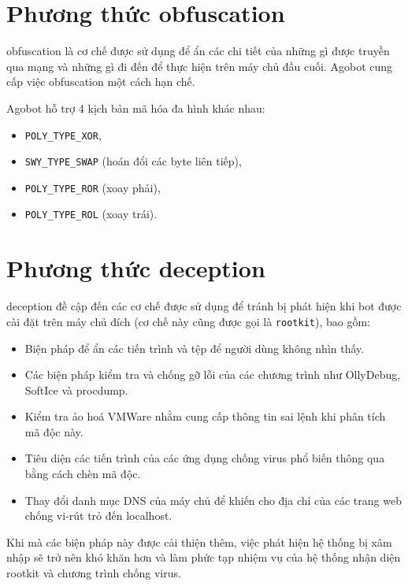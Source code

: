 \section{Phương thức obfuscation}
\Gls{obfuscation} là cơ chế được sử dụng để ẩn các chi tiết của những gì được
truyền qua mạng và những gì đi đến để thực hiện trên máy chủ đầu cuối.
Agobot cung cấp việc \gls{obfuscation} một cách hạn chế.

Agobot hỗ trợ 4 kịch bản mã hóa đa hình khác nhau:
\begin{itemize}
\item \texttt{POLY\_TYPE\_XOR},
\item \texttt{SWY\_TYPE\_SWAP} (hoán đổi các byte liên tiếp),
\item \texttt{POLY\_TYPE\_ROR} (xoay phải),
\item \texttt{POLY\_TYPE\_ROL} (xoay trái).
\end{itemize}

\section{Phương thức deception}

\Gls{deception} đề cập đến các cơ chế được sử dụng để tránh bị phát hiện khi bot được cài đặt
trên máy chủ đích (cơ chế này cũng được gọi là \texttt{rootkit}), bao gồm:

\begin{itemize}
\item Biện pháp để ẩn các tiến trình và tệp để người dùng không nhìn thấy.
\item Các biện pháp kiểm tra và chống gỡ lỗi của các chương trình như OllyDebug, SoftIce và procdump.
\item Kiểm tra ảo hoá VMWare nhằm cung cấp thông tin sai lệnh khi phân tích mã độc này.
\item Tiêu diện các tiến trình của các ứng dụng chống virus phổ biến thông qua bằng cách chèn mã độc.
\item Thay đổi danh mục DNS của máy chủ để khiến cho địa chỉ của các trang web chống vi-rút trỏ đến localhost.

\end{itemize}

Khi mà các biện pháp này được cải thiện thêm, việc phát hiện hệ thống bị xâm nhập sẽ trở nên khó khăn hơn và làm phức tạp
nhiệm vụ của hệ thống nhận diện rootkit và chương trình chống virus.



